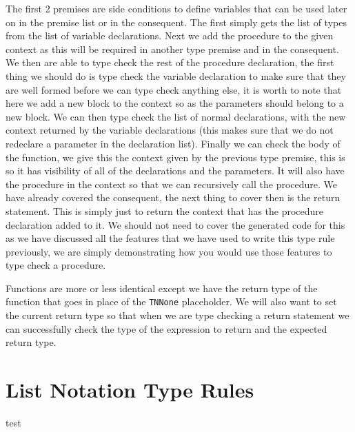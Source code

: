The first 2 premises are side conditions to define variables that can be used later on in the premise list or in the consequent.
The first simply gets the list of types from the list of variable declarations.
Next we add the procedure to the given context as this will be required in another type premise and in the consequent.
We then are able to type check the rest of the procedure declaration, the first thing we should do is type check the variable declaration to make sure that they are well formed before we can type check anything else, it is worth to note that here we add a new block to the context so as the parameters should belong to a new block.
We can then type check the list of normal declarations, with the new context returned by the variable declarations (this makes sure that we do not redeclare a parameter in the declaration list).
Finally we can check the body of the function, we give this the context given by the previous type premise, this is so it has visibility of all of the declarations and the parameters.
It will also have the procedure in the context so that we can recursively call the procedure.
We have already covered the consequent, the next thing to cover then is the return statement.
This is simply just to return the context that has the procedure declaration added to it.
We should not need to cover the generated code for this as we have discussed all the features that we have used to write this type rule previously, we are simply demonstrating how you would use those features to type check a procedure.

Functions are more or less identical except we have the return type of the function that goes in place of the \texttt{TNNone} placeholder.
We will also want to set the current return type so that when we are type checking a return statement we can successfully check the type of the expression to return and the expected return type.

\section{List Notation Type Rules}

\pagebreak
test
%
%
%
%
%
